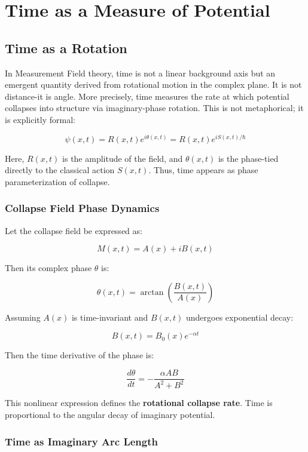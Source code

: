\chapter{Time as a Measure of Potential}
  
\section{Time as a Rotation}

In Measurement Field theory, time is not a linear background axis but an emergent quantity derived from rotational motion in the complex plane. \cite{chapter_time} It is not distance-it is angle. More precisely, time measures the rate at which potential collapses into structure via imaginary-phase rotation. \cite{chapter_time} This is not metaphorical; it is explicitly formal:

\[
\psi(x,t) = R(x,t) e^{i\theta(x,t)} = R(x,t) e^{i S(x,t)/\hbar}
\]

Here, $R(x,t)$ is the amplitude of the field, and $\theta(x,t)$ is the phase-tied directly to the classical action $S(x,t)$. \cite{chapter_time} Thus, time appears as phase parameterization of collapse. \cite{chapter_time} \subsection*{Collapse Field Phase Dynamics}

Let the collapse field be expressed as:

\[
M(x,t) = A(x) + i B(x,t)
\]

Then its complex phase $\theta$ is:

\[
\theta(x,t) = \arctan\left( \frac{B(x,t)}{A(x)} \right)
\]

Assuming $A(x)$ is time-invariant and $B(x,t)$ undergoes exponential decay:

\[
B(x,t) = B_0(x) e^{-\alpha t}
\]

Then the time derivative of the phase is:

\[
\frac{d\theta}{dt} = -\frac{\alpha A B}{A^2 + B^2}
\]

This nonlinear expression defines the \textbf{rotational collapse rate}. \cite{chapter_time} Time is proportional to the angular decay of imaginary potential. \cite{chapter_time} \subsection*{Time as Imaginary Arc Length}

